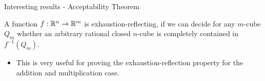 \begin{frame}{Interesting results - Acceptability Theorem }
    \pause
    \begin{minipage}[t]{0.45\linewidth}
    \vspace{-2.5em}
    \begin{theorem}
        A function $f:\mathbb{R}^n \to\mathbb{R}^m$ is exhaustion-reflecting, if we can decide for any $m$-cube $Q_m$ whether an arbitrary rational closed $n$-cube is completely contained in $f^{-1}(Q_m)$.
    \end{theorem}
    \pause
    \begin{itemize}
        \item This is very useful for proving the exhaustion-reflection property for the addition and multiplication case.
    \end{itemize}


\end{minipage}
\end{frame}
